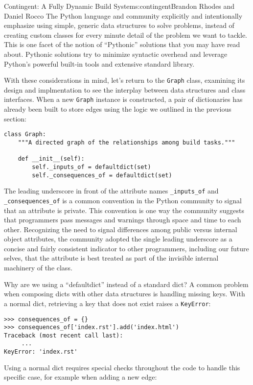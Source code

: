 \begin{aosachapter}{Contingent: A Fully Dynamic Build System}{s:contingent}{Brandon Rhodes and Daniel Rocco}
The Python language and community explicitly and intentionally emphasize
using simple, generic data structures to solve problems, instead of
creating custom classes for every minute detail of the problem we want
to tackle. This is one facet of the notion of ``Pythonic'' solutions
that you may have read about. Pythonic solutions try to minimize
syntactic overhead and leverage Python's powerful built-in tools and
extensive standard library.

With these considerations in mind, let's return to the \texttt{Graph}
class, examining its design and implmentation to see the interplay
between data structures and class interfaces. When a new \texttt{Graph}
instance is constructed, a pair of dictionaries has already been built
to store edges using the logic we outlined in the previous section:

\begin{verbatim}
class Graph:
    """A directed graph of the relationships among build tasks."""

    def __init__(self):
        self._inputs_of = defaultdict(set)
        self._consequences_of = defaultdict(set)
\end{verbatim}

The leading underscore in front of the attribute names
\texttt{\_inputs\_of} and \texttt{\_consequences\_of} is a common
convention in the Python community to signal that an attribute is
private. This convention is one way the community suggests that
programmers pass messages and warnings through space and time to each
other. Recognizing the need to signal differences among public versus
internal object attributes, the community adopted the single leading
underscore as a concise and fairly consistent indicator to other
programmers, including our future selves, that the attribute is best
treated as part of the invisible internal machinery of the class.

Why are we using a ``defaultdict'' instead of a standard dict? A common
problem when composing dicts with other data structures is handling
missing keys. With a normal dict, retrieving a key that does not exist
raises a \texttt{KeyError}:

\begin{verbatim}
>>> consequences_of = {}
>>> consequences_of['index.rst'].add('index.html')
Traceback (most recent call last):
     ...
KeyError: 'index.rst'
\end{verbatim}

Using a normal dict requires special checks throughout the code to
handle this specific case, for example when adding a new edge:


\end{aosachapter}

